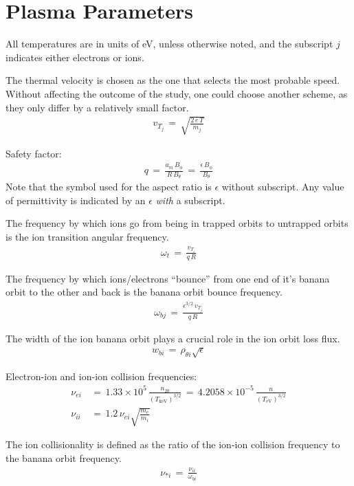 \chapter{Plasma Parameters}\label{chapter:Plasma_Parameters}

All temperatures are in units of eV, unless otherwise noted, and the subscript $j$ indicates either electrons or ions.

The thermal velocity is chosen as the one that selects the most probable speed.
Without affecting the outcome of the study, one could choose another scheme, as they only differ by a relatively small factor.
\begin{align}
	v_{T_j} \,=\, \sqrt{\frac{2 \, e \, T}{m_j}}
		\label{eq:thermal_velocity}
\end{align}

Safety factor:
\begin{align}
	q \,=\, \frac{a_m \, B_\phi}{R \, B_\theta} \,=\,
		\frac{\epsilon \, B_\phi}{B_\theta} \label{eq:safety_factor}
\end{align}
Note that the symbol used for the aspect ratio is $\epsilon$ without subscript.
Any value of permittivity is indicated by an $\epsilon$ \emph{with} a subscript.

The frequency by which ions go from being in trapped orbits to untrapped orbits is the ion transition angular frequency.
\begin{align}
	\omega_t \,=\, \frac{v_{T_i}}{q \, R} \label{eq:transition_freq}
\end{align}

The frequency by which ions/electrons ``bounce'' from one end of it's banana orbit to the other and back is the banana orbit bounce frequency.
\begin{align}
	\omega_{bj} \,=\, \frac{\epsilon^{3/2} \, v_{T_j}}{q \, R}
		\label{eq:banana_bounce_freq}
\end{align}

The width of the ion banana orbit plays a crucial role in the ion orbit loss flux.
\begin{align}
	w_{bi} \,=\, \rho_{\theta i} \sqrt{\epsilon} \label{eq:banana_width}
\end{align}

Electron-ion and ion-ion collision frequencies:
\begin{align}
	\nu_{ei} \,&=\, 1.33\times 10^5 \, \frac{n_{20}}{(T_\text{keV})^{3/2}}
		\,=\, 4.2058\times 10^{-5} \, \frac{n}{(T_\text{eV})^{3/2}}
		\label{eq:nu_ei} \\
	\nu_{ii} \,&=\, 1.2 \, \nu_{ei} \sqrt{\frac{m_e}{m_i}} \label{eq:nu_ii}
\end{align}

The ion collisionality is defined as the ratio of the ion-ion collision frequency to the banana orbit frequency.
\begin{align}
	\nu_{*i} \,=\, \frac{\nu_{ii}}{\omega_{bi}} \label{eq:collisionality}
\end{align}

